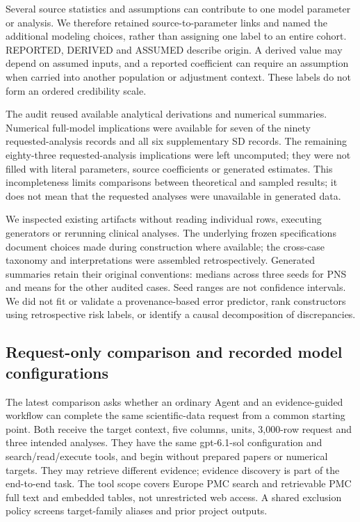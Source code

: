 \documentclass[11pt,letterpaper]{article}
\begin{document}
Several source statistics and assumptions can contribute to one model parameter or analysis. We therefore retained source-to-parameter links and named the additional modeling choices, rather than assigning one label to an entire cohort. REPORTED, DERIVED and ASSUMED describe origin. A derived value may depend on assumed inputs, and a reported coefficient can require an assumption when carried into another population or adjustment context. These labels do not form an ordered credibility scale.


The audit reused available analytical derivations and numerical summaries. Numerical full-model implications were available for seven of the ninety requested-analysis records and all six supplementary SD records. The remaining eighty-three requested-analysis implications were left uncomputed; they were not filled with literal parameters, source coefficients or generated estimates. This incompleteness limits comparisons between theoretical and sampled results; it does not mean that the requested analyses were unavailable in generated data.


We inspected existing artifacts without reading individual rows, executing generators or rerunning clinical analyses. The underlying frozen specifications document choices made during construction where available; the cross-case taxonomy and interpretations were assembled retrospectively. Generated summaries retain their original conventions: medians across three seeds for PNS and means for the other audited cases. Seed ranges are not confidence intervals. We did not fit or validate a provenance-based error predictor, rank constructors using retrospective risk labels, or identify a causal decomposition of discrepancies.


\subsection{Request-only comparison and recorded model configurations}

The latest comparison asks whether an ordinary Agent and an evidence-guided workflow can complete the same scientific-data request from a common starting point. Both receive the target context, five columns, units, 3,000-row request and three intended analyses. They have the same gpt-6.1-sol configuration and search/\allowbreak{}read/\allowbreak{}execute tools, and begin without prepared papers or numerical targets. They may retrieve different evidence; evidence discovery is part of the end-to-end task. The tool scope covers Europe PMC search and retrievable PMC full text and embedded tables, not unrestricted web access. A shared exclusion policy screens target-family aliases and prior project outputs.
\end{document}
